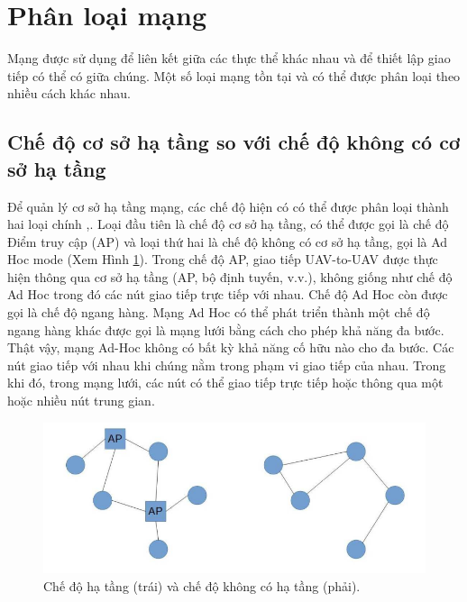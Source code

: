 \documentclass[11pt,openany]{book}
\begin{document}
\section{Phân loại mạng}
Mạng được sử dụng để liên kết giữa các thực thể khác nhau và để thiết lập giao tiếp có thể có giữa chúng. Một số loại mạng tồn tại và có thể được phân loại theo nhiều cách khác nhau.
\subsection{Chế độ cơ sở hạ tầng so với chế độ không có cơ sở hạ tầng}
Để quản lý cơ sở hạ tầng mạng, các chế độ hiện có có thể được phân loại thành hai loại chính \cite{bekmezci2013flying},\cite{hayat2015experimental}. Loại đầu tiên là chế độ cơ sở hạ tầng, có thể được gọi là chế độ Điểm truy cập (AP) và loại thứ hai là chế độ không có cơ sở hạ tầng, gọi là Ad Hoc mode (Xem Hình \ref{fig:4.1}). Trong chế độ AP, giao tiếp UAV-to-UAV được thực hiện thông qua cơ sở hạ tầng (AP, bộ định tuyến, v.v.), không giống như chế độ Ad Hoc trong đó các nút giao tiếp trực tiếp với nhau. Chế độ Ad Hoc còn được gọi là chế độ ngang hàng. Mạng Ad Hoc có thể phát triển thành một chế độ ngang hàng khác được gọi là mạng lưới bằng cách cho phép khả năng đa bước. Thật vậy, mạng Ad-Hoc không có bất kỳ khả năng cố hữu nào cho đa bước. Các nút giao tiếp với nhau khi chúng nằm trong phạm vi giao tiếp của nhau. Trong khi đó, trong mạng lưới, các nút có thể giao tiếp trực tiếp hoặc thông qua một hoặc nhiều nút trung gian.
\begin{figure}[H]
    \centering
    \includegraphics[scale=0.4]{assets/4_1.png}
    \caption{Chế độ hạ tầng (trái) và chế độ không có hạ tầng (phải).}
    \label{fig:4.1}
\end{figure}
\end{document}
